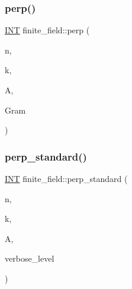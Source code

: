 \subsubsection{\texorpdfstring{perp()}{perp()}}
{\footnotesize\ttfamily \mbox{\hyperlink{galois_8h_a09fddde158a3a20bd2dcadb609de11dc}{I\+NT}} finite\+\_\+field\+::perp (\begin{DoxyParamCaption}\item[{\mbox{\hyperlink{galois_8h_a09fddde158a3a20bd2dcadb609de11dc}{I\+NT}}}]{n,  }\item[{\mbox{\hyperlink{galois_8h_a09fddde158a3a20bd2dcadb609de11dc}{I\+NT}}}]{k,  }\item[{\mbox{\hyperlink{galois_8h_a09fddde158a3a20bd2dcadb609de11dc}{I\+NT}} $\ast$}]{A,  }\item[{\mbox{\hyperlink{galois_8h_a09fddde158a3a20bd2dcadb609de11dc}{I\+NT}} $\ast$}]{Gram }\end{DoxyParamCaption})}

\mbox{\label{classfinite__field_a2f5bc92908aea624a8d9179d2a9ba057}} 
\subsubsection{\texorpdfstring{perp\+\_\+standard()}{perp\_standard()}}
{\footnotesize\ttfamily \mbox{\hyperlink{galois_8h_a09fddde158a3a20bd2dcadb609de11dc}{I\+NT}} finite\+\_\+field\+::perp\+\_\+standard (\begin{DoxyParamCaption}\item[{\mbox{\hyperlink{galois_8h_a09fddde158a3a20bd2dcadb609de11dc}{I\+NT}}}]{n,  }\item[{\mbox{\hyperlink{galois_8h_a09fddde158a3a20bd2dcadb609de11dc}{I\+NT}}}]{k,  }\item[{\mbox{\hyperlink{galois_8h_a09fddde158a3a20bd2dcadb609de11dc}{I\+NT}} $\ast$}]{A,  }\item[{\mbox{\hyperlink{galois_8h_a09fddde158a3a20bd2dcadb609de11dc}{I\+NT}}}]{verbose\+\_\+level }\end{DoxyParamCaption})}

\mbox{\label{classfinite__field_aae3cca9b5f19ae969a9c5349d14f41c0}} 
